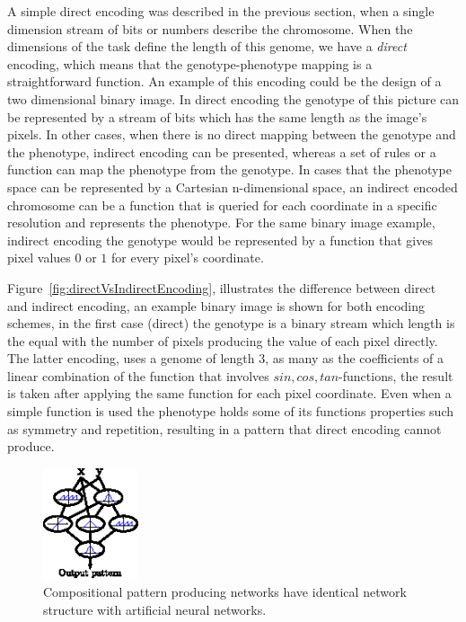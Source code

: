A simple direct encoding was described in the previous section, when a single dimension stream of bits or numbers describe the chromosome. When the dimensions of the task define the length of this genome, we have a \emph{direct} encoding, which means that the genotype-phenotype mapping is a straightforward function. An example of this encoding could be the design of a two dimensional binary image. In direct encoding the genotype of this picture can be represented by a stream of bits which has the same length as the image's pixels. In other cases, when there is no direct mapping between the genotype and the phenotype, indirect encoding can be presented, whereas a set of rules or a function can map the phenotype from the genotype. In cases that the phenotype space can be represented by a Cartesian n-dimensional space, an indirect encoded chromosome can be a function that is queried for each coordinate in a specific resolution and represents the phenotype. For the same binary image example, indirect encoding the genotype would be represented by a function that gives pixel values $0$ or $1$ for every pixel's coordinate. 



Figure~\ref{fig:directVsIndirectEncoding}, illustrates the difference between direct and indirect encoding, an example binary image is shown for both encoding schemes, in the first case (direct) the genotype is a binary stream which length is the equal with the number of pixels producing the value of each pixel directly. The latter encoding, uses a genome of length 3, as many as the coefficients of a linear combination of the function that involves $sin, cos, tan$-functions, the result is taken after applying the same function for each pixel coordinate. Even when a simple function is used the  phenotype holds some of its functions properties such as symmetry and repetition, resulting in a pattern that direct encoding cannot produce.


\begin{figure}[t!]
\centering
\includegraphics[width=0.25\textwidth]{../Figures/Misc/cppnNetwork.eps}
\caption{Compositional pattern producing networks have identical network structure with artificial neural networks.}
\label{fig:cppnNetwork}
\end{figure}



